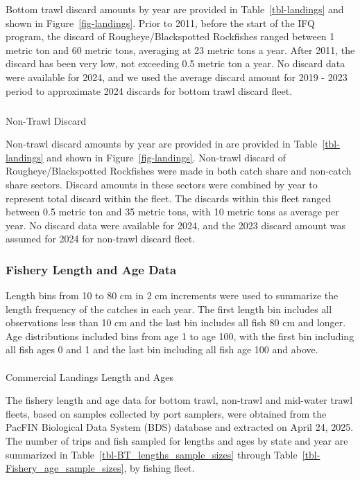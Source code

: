 \documentclass[
]{scrartcl}
\makeatletter
\let\oldparagraph\paragraph
\renewcommand{\paragraph}{
    \@ifstar
      \xxxParagraphStar
      \xxxParagraphNoStar
  }
\newcommand{\xxxParagraphStar}[1]{\oldparagraph*{#1}\mbox{}}
\newcommand{\xxxParagraphNoStar}[1]{\oldparagraph{#1}\mbox{}}
\let\oldsubparagraph\subparagraph
\renewcommand{\subparagraph}{
    \@ifstar
      \xxxSubParagraphStar
      \xxxSubParagraphNoStar
  }
\newcommand{\xxxSubParagraphStar}[1]{\oldsubparagraph*{#1}\mbox{}}
\newcommand{\xxxSubParagraphNoStar}[1]{\oldsubparagraph{#1}\mbox{}}
\makeatother
\begin{document}
Bottom trawl discard amounts by year are provided in
Table~\ref{tbl-landings} and shown in Figure~\ref{fig-landings}. Prior
to 2011, before the start of the IFQ program, the discard of
Rougheye/Blackspotted Rockfishes ranged between 1 metric ton and 60
metric tons, averaging at 23 metric tons a year. After 2011, the discard
has been very low, not exceeding 0.5 metric ton a year. No discard data
were available for 2024, and we used the average discard amount for 2019
- 2023 period to approximate 2024 discards for bottom trawl discard
fleet.

\subparagraph{Non-Trawl Discard}\label{non-trawl-discard}

Non-trawl discard amounts by year are provided in are provided in
Table~\ref{tbl-landings} and shown in Figure~\ref{fig-landings}.
Non-trawl discard of Rougheye/Blackspotted Rockfishes were made in both
catch share and non-catch share sectors. Discard amounts in these
sectors were combined by year to represent total discard within the
fleet. The discards within this fleet ranged between 0.5 metric ton and
35 metric tons, with 10 metric tons as average per year. No discard data
were available for 2024, and the 2023 discard amount was assumed for
2024 for non-trawl discard fleet.

\subsubsection{Fishery Length and Age
Data}\label{fishery-length-and-age-data}

Length bins from 10 to 80 cm in 2 cm increments were used to summarize
the length frequency of the catches in each year. The first length bin
includes all observations less than 10 cm and the last bin includes all
fish 80 cm and longer. Age distributions included bins from age 1 to age
100, with the first bin including all fish ages 0 and 1 and the last bin
including all fish age 100 and above.

\paragraph{Commercial Landings Length and
Ages}\label{commercial-landings-length-and-ages}

The fishery length and age data for bottom trawl, non-trawl and
mid-water trawl fleets, based on samples collected by port samplers,
were obtained from the PacFIN Biological Data System (BDS) database and
extracted on April 24, 2025. The number of trips and fish sampled for
lengths and ages by state and year are summarized in
Table~\ref{tbl-BT_lengths_sample_sizes} through
Table~\ref{tbl-Fishery_age_sample_sizes}, by fishing fleet.
\end{document}
